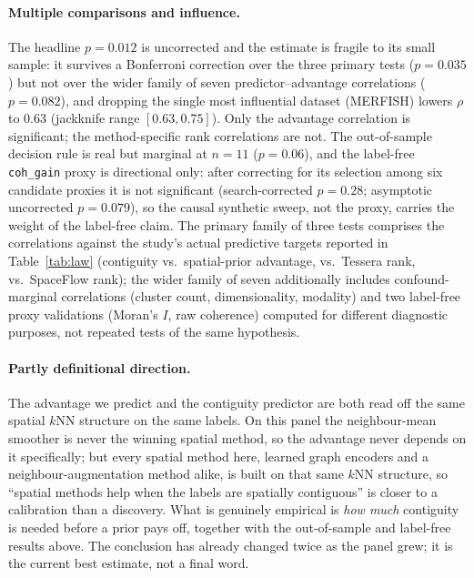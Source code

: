 \documentclass[journal]{IEEEtran}
\begin{document}
\paragraph{Multiple comparisons and influence.} The headline $p=0.012$ is uncorrected and the estimate is
fragile to its small sample: it survives a Bonferroni correction over the three primary tests ($p=0.035$)
but not over the wider family of seven predictor--advantage correlations ($p=0.082$), and dropping the
single most influential dataset (MERFISH) lowers $\rho$ to $0.63$ (jackknife range $[0.63,0.75]$). Only the
advantage correlation is significant; the method-specific rank correlations are not. The out-of-sample
decision rule is real but marginal at $n{=}11$ ($p=0.06$), and the label-free \texttt{coh\_gain} proxy is
directional only: after correcting for its selection among six candidate proxies it is not significant
(search-corrected $p=0.28$; asymptotic uncorrected $p=0.079$), so the causal synthetic sweep, not the proxy, carries the
weight of the label-free claim. The primary family of
three tests comprises the correlations against the study's actual predictive targets reported in
Table~\ref{tab:law} (contiguity vs.\ spatial-prior advantage, vs.\ Tessera rank, vs.\ SpaceFlow rank); the
wider family of seven additionally includes confound-marginal
correlations (cluster count, dimensionality, modality) and two label-free proxy validations (Moran's $I$,
raw coherence) computed for different diagnostic purposes, not repeated tests of the same hypothesis.

\paragraph{Partly definitional direction.} The advantage we predict and the contiguity predictor are both
read off the same spatial $k$NN structure on the same labels. On this panel the neighbour-mean smoother is
never the winning spatial method, so the advantage never depends on it specifically; but every spatial
method here, learned graph encoders and a neighbour-augmentation method alike, is built on that same
$k$NN structure, so ``spatial methods help when the labels are spatially contiguous'' is closer to a
calibration than a discovery. What is genuinely empirical is \emph{how much} contiguity is needed before a
prior pays off, together with the out-of-sample and label-free results above. The conclusion has already
changed twice as the panel grew; it is the current best estimate, not a final word.
\end{document}
